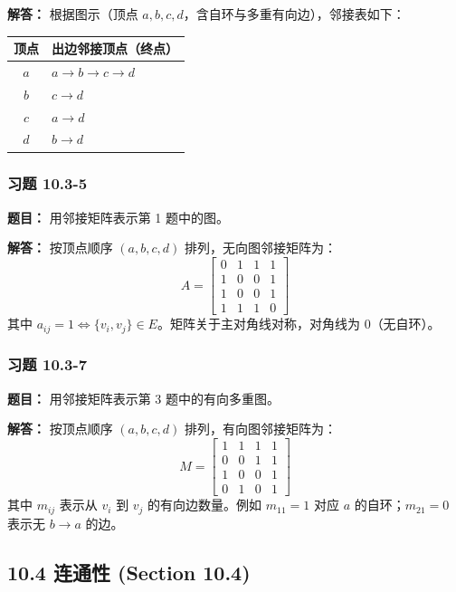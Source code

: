 \documentclass[11pt,UTF8]{article}
\begin{document}
\textbf{解答：} 根据图示（顶点 $a,b,c,d$，含自环与多重有向边），邻接表如下：

\begin{center}
\begin{tabular}{c|l}
顶点 & 出边邻接顶点（终点） \\
\hline
$a$ & $a \to b \to c \to d$ \\
$b$ & $c \to d$ \\
$c$ & $a \to d$ \\
$d$ & $b \to d$
\end{tabular}
\end{center}

\subsubsection*{习题 10.3-5}
\textbf{题目：} 用邻接矩阵表示第 1 题中的图。

\textbf{解答：} 按顶点顺序 $(a,b,c,d)$ 排列，无向图邻接矩阵为：
\[ A = \begin{bmatrix}
0 & 1 & 1 & 1 \\
1 & 0 & 0 & 1 \\
1 & 0 & 0 & 1 \\
1 & 1 & 1 & 0
\end{bmatrix} \]
其中 $a_{ij}=1 \iff \{v_i,v_j\} \in E$。矩阵关于主对角线对称，对角线为 $0$（无自环）。

\subsubsection*{习题 10.3-7}
\textbf{题目：} 用邻接矩阵表示第 3 题中的有向多重图。

\textbf{解答：} 按顶点顺序 $(a,b,c,d)$ 排列，有向图邻接矩阵为：
\[ M = \begin{bmatrix}
1 & 1 & 1 & 1 \\
0 & 0 & 1 & 1 \\
1 & 0 & 0 & 1 \\
0 & 1 & 0 & 1
\end{bmatrix} \]
其中 $m_{ij}$ 表示从 $v_i$ 到 $v_j$ 的有向边数量。例如 $m_{11}=1$ 对应 $a$ 的自环；$m_{21}=0$ 表示无 $b \to a$ 的边。



\subsection{10.4 连通性 (Section 10.4)}
\end{document}
